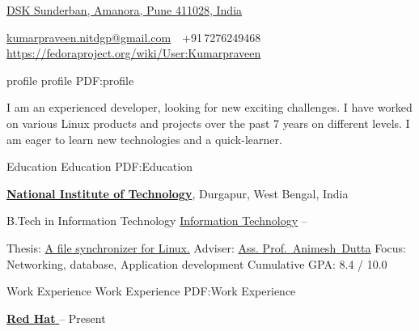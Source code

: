 \documentclass[letterpaper,MMMyyyy,nonstopmode]{simpleresumecv}
\newcommand{\CVAuthor}{Praveen Kumar}
\newcommand{\CVWebpage}{https://fedoraproject.org/wiki/User:Kumarpraveen}
\begin{document}

\Title{\CVAuthor}

\begin{SubTitle}
\href{https://www.google.com/maps/place/Pune+India}
{DSK Sunderban, Amanora, Pune 411028, India}
\par
\href{mailto:kumarpraveen.nitdgp@gmail.com}
{kumarpraveen.nitdgp@gmail.com}
\,\SubBulletSymbol\,
+91\,7276249468
\,\SubBulletSymbol\,
\href{\CVWebpage}
{\url{\CVWebpage}}
\end{SubTitle}

\begin{Body}

\Section
{profile}
{profile}
{PDF:profile}

\Entry
\begin{Detail}
I am an experienced developer, looking for new exciting challenges. I have worked on various Linux products and projects over the past 7 years on different levels. I am eager to learn new technologies and a quick-learner.
\end{Detail}


\Section
{Education}
{Education}
{PDF:Education}

\Entry
\href{https://www.nitdgp.ac.in/}
{\textbf{National Institute of Technology}},
Durgapur, West Bengal, India

\Gap
\BulletItem
B.Tech in Information Technology
\href{https://www.nitdgp.ac.in/department/CS}
{Information Technology}
\hfill
{} --
\begin{Detail}
\SubBulletItem
Thesis:
\href{https://bitbucket.org/kumarpraveen/lsync}
{A file synchronizer for Linux.}
\SubBulletItem
Adviser:
\href{https://www.nitdgp.ac.in/faculty/fcb853d8-bbdb-4327-a31f-1eda672da992}
{Ass. Prof.~Animesh~Dutta}
\SubBulletItem
Focus:
Networking, database, Application development
\SubBulletItem
Cumulative GPA: 8.4 / 10.0
\end{Detail}


\Section
{Work Experience}
{Work Experience}
{PDF:Work Experience}

\Entry
\href{https://redhat.com}
{\textbf{Red Hat }}
\hfill
{} --
Present


\end{Body}
\end{document}
